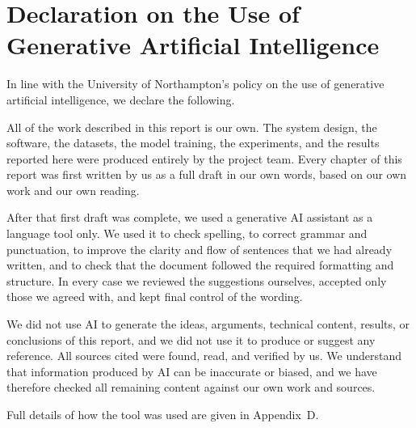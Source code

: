 \chapter*{Declaration on the Use of Generative Artificial Intelligence}

In line with the University of Northampton's policy on the use of generative
artificial intelligence, we declare the following.

All of the work described in this report is our own. The system design, the
software, the datasets, the model training, the experiments, and the results
reported here were produced entirely by the project team. Every chapter of this
report was first written by us as a full draft in our own words, based on our own
work and our own reading.

After that first draft was complete, we used a generative AI assistant as a
language tool only. We used it to check spelling, to correct grammar and
punctuation, to improve the clarity and flow of sentences that we had already
written, and to check that the document followed the required formatting and
structure. In every case we reviewed the suggestions ourselves, accepted only
those we agreed with, and kept final control of the wording.

We did not use AI to generate the ideas, arguments, technical content, results,
or conclusions of this report, and we did not use it to produce or suggest any
reference. All sources cited were found, read, and verified by us. We understand
that information produced by AI can be inaccurate or biased, and we have
therefore checked all remaining content against our own work and sources.

Full details of how the tool was used are given in Appendix~D.

\clearpage
